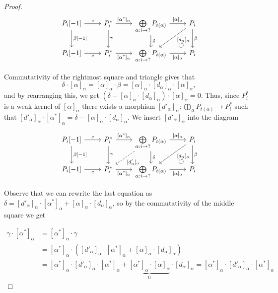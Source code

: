 \documentclass[12pt, dvipsnames, oneside]{amsart}
\theoremstyle{definition}
\begin{document}
\begin{proof}
\begin{equation*}
\begin{tikzcd}
P_i[-1] \arrow[r, "c"] \arrow[d, "{\beta[-1]}"] & P_i^* \arrow[r, "{[\alpha^*]_{\alpha}}"] \arrow[d, "{\gamma}"] & \bigoplus\limits_{\alpha:i\rightarrow ?}P_{t(\alpha)}  \arrow[r, "{[\alpha]_{\alpha}}"] \arrow[d, "{\delta}"] \arrow[dr, phantom, "\circlearrowleft", near end ] & P_i \arrow[d, "{\beta}"] \arrow[dl, pos=0.4, "{[d_\alpha]_\alpha}"] \\
P_i[-1] \arrow[r, "c"'] & P_i^* \arrow[r, "{[\alpha^*]_{\alpha}}"']  & \bigoplus\limits_{\alpha:i\rightarrow ?} P_{t(\alpha)}  \arrow[r, "{[\alpha]_{\alpha}}"'] & P_i
\end{tikzcd}
\end{equation*}

Commutativity of the rightmost square and triangle gives that 
$$\delta\cdot[\alpha]_{\alpha}=[\alpha]_{\alpha}\cdot\beta=[\alpha]_{\alpha}\cdot [d_\alpha]_\alpha\cdot[\alpha]_{\alpha},$$ 
and by rearranging this, we get $\left( \delta - [\alpha]_\alpha\cdot [d_\alpha]_\alpha \right)\cdot [\alpha]_\alpha=0$. Thus, since $P_i^*$ is a weak kernel of $[\alpha]_{\alpha}$ there exists a morphism $[d'_\alpha]_\alpha\colon \bigoplus_{\alpha}P_{t(\alpha)} \rightarrow P_i^*$ such that $[d'_\alpha]_\alpha\cdot [\alpha^*]_{\alpha}= \delta - [\alpha]_\alpha\cdot [d_\alpha]_\alpha$. We insert $[d'_\alpha]_\alpha$ into the diagram

\begin{equation*}
\begin{tikzcd}
P_i[-1] \arrow[r, "c"] \arrow[d, "{\beta[-1]}"] & P_i^* \arrow[r, "{[\alpha^*]_{\alpha}}"] \arrow[d, "{\gamma}"]  & \bigoplus\limits_{\alpha:i\rightarrow ?}P_{t(\alpha)}  \arrow[r, "{[\alpha]_{\alpha}}"] \arrow[d, "{\delta}"] \arrow[dl, dashed, "{[d'_\alpha]_\alpha}"] \arrow[dr, phantom, "\circlearrowleft", near end ] & P_i \arrow[d, "{\beta}"] \arrow[dl, pos=0.4, "{[d_\alpha]_\alpha}"] \\
P_i[-1] \arrow[r, "c"'] & P_i^* \arrow[r, "{[\alpha^*]_{\alpha}}"']  & \bigoplus\limits_{\alpha:i\rightarrow ?} P_{t(\alpha)}  \arrow[r, "{[\alpha]_{\alpha}}"'] & P_i
\end{tikzcd}
\end{equation*}

Observe that we can rewrite the last equation as $\delta=[d'_\alpha]_\alpha\cdot[\alpha^*]_{\alpha} + [\alpha]_\alpha\cdot[d_\alpha]_\alpha$, so by the commutativity of the middle square we get 

\begin{align*}
\gamma\cdot[\alpha^*]_{\alpha} &= [\alpha^*]_{\alpha}\cdot\gamma \\
&=  [\alpha^*]_{\alpha}\cdot\left([d'_\alpha]_\alpha\cdot[\alpha^*]_{\alpha} +  [\alpha]_{\alpha}\cdot[d_\alpha]_\alpha\right) \\
&= [\alpha^*]_{\alpha}\cdot [d'_\alpha]_\alpha\cdot[\alpha^*]_{\alpha} + \underbrace{[\alpha^*]_{\alpha}\cdot[\alpha]_{\alpha}}_{0}\cdot[d_\alpha]_\alpha = [\alpha^*]_{\alpha}\cdot [d'_\alpha]_\alpha\cdot[\alpha^*]_{\alpha}
\end{align*}


\end{proof}
\end{document}
